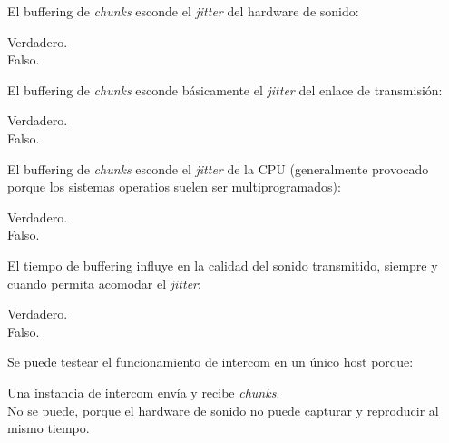 \documentclass[legalpaper, 12pt, addpoints]{exam}
\begin{document}
\begin{questions}
\vspace{0.10in}

\question El buffering de \emph{chunks} esconde el \emph{jitter} del hardware de sonido:

\begin{oneparchoices}
  \choice Verdadero.\\
  \choice Falso.
\end{oneparchoices}
  
\vspace{0.10in}

\question El buffering de \emph{chunks} esconde básicamente el \emph{jitter} del enlace de transmisión:

\begin{oneparchoices}
  \choice Verdadero.\\
  \choice Falso.
\end{oneparchoices}
  
\vspace{0.10in}

\question El buffering de \emph{chunks} esconde el \emph{jitter} de la CPU
(generalmente provocado porque los sistemas operatios suelen ser
multiprogramados):

\begin{oneparchoices}
  \choice Verdadero.\\
  \choice Falso.
\end{oneparchoices}
  
\vspace{0.10in}

\question El tiempo de buffering influye en la calidad del sonido transmitido, siempre y cuando permita acomodar el \emph{jitter}:

\begin{oneparchoices}
  \choice Verdadero.\\
  \choice Falso.
\end{oneparchoices}
  
\vspace{0.10in}

\question Se puede testear el funcionamiento de intercom en un único host porque:

\begin{oneparchoices}
  \choice Una instancia de intercom envía y recibe \emph{chunks}.\\
  \choice No se puede, porque el hardware de sonido no puede capturar y reproducir al mismo tiempo.
\end{oneparchoices}
  

\end{questions}
\end{document}
